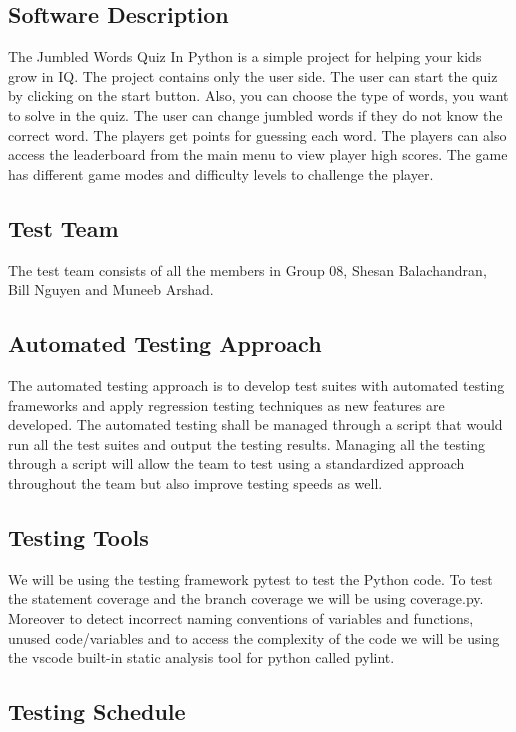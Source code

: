 \documentclass[12pt, titlepage]{article}
\begin{document}
\subsection{Software Description}

The Jumbled Words Quiz In Python is a simple project for helping your kids grow in IQ. The project contains only the user side. The user can start the quiz by clicking on the start button. Also, you can choose the type of words, you want to solve in the quiz. The user can change jumbled words if they do not know the correct word. The players get points for guessing each word. The players can also access the leaderboard from the main menu to view player high scores. The game has different game modes and difficulty levels to challenge the player.

\subsection{Test Team}

The test team consists of all the members in Group 08, Shesan Balachandran, Bill Nguyen and Muneeb Arshad. 

\subsection{Automated Testing Approach}

The automated testing approach is to develop test suites with automated testing frameworks and apply regression testing techniques as new features are developed. The automated testing shall be managed through a script that would run all the test suites and output the testing results. Managing all the testing through a script will allow the team to test using a standardized approach throughout the team but also improve testing speeds as well. 

\subsection{Testing Tools}

We will be using the testing framework pytest to test the Python code. To test the statement coverage and the branch coverage we will be using coverage.py. Moreover to detect incorrect naming conventions of variables and functions, unused code/variables and to access the complexity of the code we will be using the vscode built-in static analysis tool for python called pylint.

\subsection{Testing Schedule}
\end{document}

